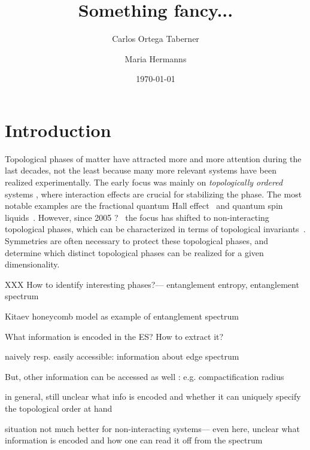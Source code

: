 \documentclass[twocolumn,amsmath,longbibliography,amssymb,superscriptaddress]{revtex4-1}
\newcommand{\maria}[1]{{\color{blue} #1}}
\begin{document}
		
\title{Something fancy...}
\author{Carlos Ortega Taberner}

\author{Maria Hermanns}
\date{\today}
		
\maketitle
	


\section{Introduction}
Topological phases of matter have attracted more and more attention during the last decades, not the least because many more relevant systems have been realized experimentally. 
The early focus was mainly on \emph{topologically ordered} systems \cite{Wen}, where interaction effects are crucial for stabilizing the phase. 
The most notable examples are the fractional quantum Hall effect~\cite{} and quantum spin liquids~\cite{}. 
However, since 2005 \maria{?}~\cite{KaneMele, etc} the focus has shifted to non-interacting topological phases, which can be characterized in terms of topological invariants~\cite{}. 
Symmetries are often necessary to protect these topological phases, and determine which distinct topological phases can be realized for a given dimensionality. 

XXX
How to identify interesting phases?--- entanglement entropy, entanglement spectrum

Kitaev honeycomb model as example of entanglement spectrum 

What information is encoded in the ES? How to extract it? 

naively resp. easily accessible: information about edge spectrum

But, other information can be accessed as well : e.g. compactification radius

in general, still unclear what info is encoded and whether it can uniquely specify the topological order at hand

situation not much better for non-interacting systems--- even here, unclear what information is encoded and how one can read it off from the spectrum
\end{document}
